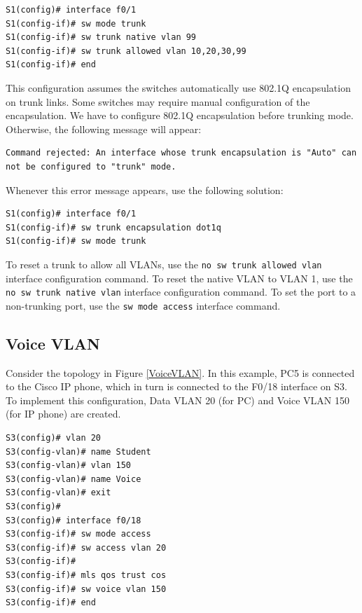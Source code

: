 \begin{verbatim}
S1(config)# interface f0/1
S1(config-if)# sw mode trunk
S1(config-if)# sw trunk native vlan 99
S1(config-if)# sw trunk allowed vlan 10,20,30,99
S1(config-if)# end
\end{verbatim}

This configuration assumes the switches automatically use 802.1Q encapsulation on trunk links. Some switches may require manual configuration of the encapsulation. We have to configure 802.1Q encapsulation before trunking mode. Otherwise, the following message will appear:

\begin{verbatim}
Command rejected: An interface whose trunk encapsulation is "Auto" can not be configured to "trunk" mode. 
\end{verbatim}

Whenever this error message appears, use the following solution:

\begin{verbatim}
S1(config)# interface f0/1
S1(config-if)# sw trunk encapsulation dot1q 
S1(config-if)# sw mode trunk
\end{verbatim}

To reset a trunk to allow all VLANs, use the \verb|no sw trunk allowed vlan| interface configuration command. To reset the native VLAN to VLAN 1, use the \verb|no sw trunk native vlan| interface configuration command. To set the port to a non-trunking port, use the \verb|sw mode access| interface command.\\

\subsection{Voice VLAN}

Consider the topology in Figure \ref{VoiceVLAN}. In this example, PC5 is connected to the Cisco IP phone, which in turn is connected to the F0/18 interface on S3. To implement this configuration, Data VLAN 20 (for PC) and Voice VLAN 150 (for IP phone) are created. 

\begin{verbatim}
S3(config)# vlan 20
S3(config-vlan)# name Student
S3(config-vlan)# vlan 150
S3(config-vlan)# name Voice
S3(config-vlan)# exit
S3(config)# 
S3(config)# interface f0/18
S3(config-if)# sw mode access
S3(config-if)# sw access vlan 20
S3(config-if)# 
S3(config-if)# mls qos trust cos
S3(config-if)# sw voice vlan 150
S3(config-if)# end
\end{verbatim}

